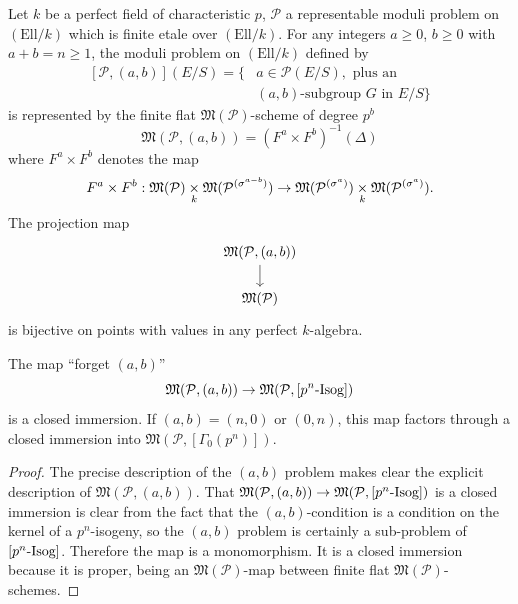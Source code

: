 \begin{kprop}\label{prop:13.4.4}
Let $k$ be a perfect field of characteristic $p$, $\mathcal{P}$ a representable moduli problem on $(\mathrm{Ell}/k)$ which is finite etale over $(\mathrm{Ell}/k)$. For any integers $a \ge 0$, $b \ge 0$ with $a + b = n \ge 1$, the moduli problem on $(\mathrm{Ell}/k)$ defined by
\[
\begin{aligned}
{}[\mathcal{P}, (a,b)](E/S) = \{ & a \in \mathcal{P}(E/S), \text{ plus an} \\
& (a,b)\text{-subgroup } G \text{ in } E/S \}
\end{aligned}
\]
is represented by the finite flat $\mathfrak{M}(\mathcal{P})$-scheme of degree $p^b$
\[
\mathfrak{M}(\mathcal{P}, (a,b)) = (F^a \times F^b)^{-1}(\Delta)
\]
where $F^a \times F^b$ denotes the map
\[
F^a \times F^b : \mathfrak{M}(\mathcal{P}) \underset{k}{\times} \mathfrak{M}(\mathcal{P}^{(\sigma^{a-b})}) \to \mathfrak{M}(\mathcal{P}^{(\sigma^a)}) \underset{k}{\times} \mathfrak{M}(\mathcal{P}^{(\sigma^a)}) .
\]
The projection map
\[
\begin{tikzcd}[row sep=1.6em]
\mathfrak{M}(\mathcal{P}, (a,b)) \arrow[d] \\
\mathfrak{M}(\mathcal{P})
\end{tikzcd}
\]
is bijective on points with values in any perfect $k$-algebra.

The map ``forget $(a,b)$''
\[
\mathfrak{M}(\mathcal{P}, (a,b)) \to \mathfrak{M}(\mathcal{P}, [p^n\text{-\rm Isog}])
\]
is a closed immersion. If $(a,b) = (n,0)$ or $(0,n)$, this map factors through a closed immersion into $\mathfrak{M}(\mathcal{P}, [\Gamma_0(p^n)])$.
\end{kprop}

\begin{proof}
The precise description of the $(a,b)$ problem makes clear the explicit description of $\mathfrak{M}(\mathcal{P}, (a,b))$. That $\mathfrak{M}(\mathcal{P}, (a,b)) \to \mathfrak{M}(\mathcal{P}, [p^n\text{-\rm Isog}])$ is a closed immersion is clear from the fact that the $(a,b)$-condition is a condition on the kernel of a $p^n$-isogeny, so the $(a,b)$ problem is certainly a sub-problem of $[p^n\text{-\rm Isog}]$. Therefore the map is a monomorphism. It is a closed immersion because it is proper, being an $\mathfrak{M}(\mathcal{P})$-map between finite flat $\mathfrak{M}(\mathcal{P})$-schemes.
\end{proof}

